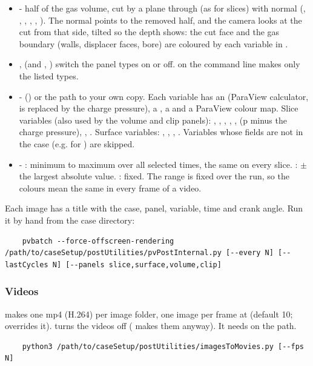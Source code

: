 \begin{itemize}
    \item \codeword{[CLIP]} - half of the gas volume, cut by a plane through  (as for slices) with normal  (, , , , , ). The normal points to the removed half, and the camera looks at the cut from that side, tilted so the depth shows: the cut face and the gas boundary (walls, displacer faces, bore) are coloured by each variable in .
    \item {},  (and , ) switch the panel types on or off.  on the command line makes only the listed types.
    \item {} -  () or the path to your own copy. Each variable has an  (ParaView calculator,  is replaced by the charge pressure), a , a  and a ParaView colour map. Slice variables (also used by the volume and clip panels): , , , , ,  (p minus the charge pressure), , . Surface variables: , , , . Variables whose fields are not in the case (e.g.  for ) are skipped.
    \item {} - : minimum to maximum over all selected times, the same on every slice. : $\pm$ the largest absolute value. : fixed. The range is fixed over the run, so the colours mean the same in every frame of a video.
\end{itemize}
Each image has a title with the case, panel, variable, time and crank angle. Run it by hand from the case directory:
\begin{lstlisting}
    pvbatch --force-offscreen-rendering /path/to/caseSetup/postUtilities/pvPostInternal.py [--every N] [--lastCycles N] [--panels slice,surface,volume,clip]
\end{lstlisting}

\subsubsection{Videos}
 makes one mp4 (H.264) per image folder, one image per frame at  (default 10;  overrides it).  turns the videos off ( makes them anyway). It needs  on the path.
\begin{lstlisting}
    python3 /path/to/caseSetup/postUtilities/imagesToMovies.py [--fps N]
\end{lstlisting}


